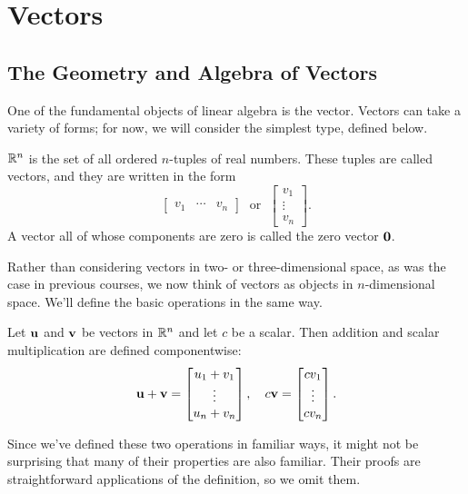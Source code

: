 \documentclass[../m073main.tex]{subfiles}
\begin{document}
\chapter{Vectors}
\section{The Geometry and Algebra of Vectors}
One of the fundamental objects of linear algebra is the vector.
Vectors can take a variety of forms; for now, we will consider the simplest type, defined below.

\begin{definition}[Vectors in $\R^n$]
	$\R^n$ is the set of all ordered $n$-tuples of real numbers.
	These tuples are called vectors, and they are written in the form
	\[ \begin{bmatrix} v_1 & \cdots & v_n \end{bmatrix} \;\text{ or }\; \begin{bmatrix} v_1 \\ \vdots \\ v_n \end{bmatrix}. \]
	A vector all of whose components are zero is called the zero vector $\mathbf{0}$.
\end{definition}

Rather than considering vectors in two- or three-dimensional space, as was the case in previous courses, we now think of vectors as objects in $n$-dimensional space.
We'll define the basic operations in the same way.

\begin{definition}
	Let $\mathbf{u}$ and $\mathbf{v}$ be vectors in $\R^n$ and let $c$ be a scalar.
	Then addition and scalar multiplication are defined componentwise:
	\[ \mathbf{u} + \mathbf{v} = \begin{bmatrix} u_1 + v_1 \\ \vdots \\ u_n + v_n \end{bmatrix}, \quad c \mathbf{v} = \begin{bmatrix} cv_1 \\ \vdots \\ cv_n \end{bmatrix}. \]
\end{definition}

Since we've defined these two operations in familiar ways, it might not be surprising that many of their properties are also familiar.
Their proofs are straightforward applications of the definition, so we omit them.
\end{document}
